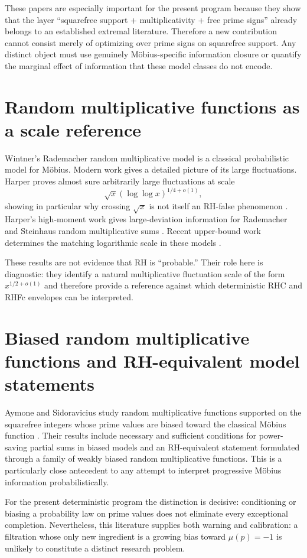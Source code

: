 \documentclass[11pt]{article}
\begin{document}
These papers are especially important for the present program because they show that the layer ``squarefree support + multiplicativity + free prime signs'' already belongs to an established extremal literature.  Therefore a new contribution cannot consist merely of optimizing over prime signs on squarefree support.  Any distinct object must use genuinely Möbius-specific information closure or quantify the marginal effect of information that these model classes do not encode.

\section{Random multiplicative functions as a scale reference}
Wintner's Rademacher random multiplicative model is a classical probabilistic model for Möbius.  Modern work gives a detailed picture of its large fluctuations.  Harper proves almost sure arbitrarily large fluctuations at scale
\[
 \sqrt{x}(\log\log x)^{1/4+o(1)},
\]
showing in particular why crossing $\sqrt{x}$ is not itself an RH-false phenomenon \cite{Harper2023}.  Harper's high-moment work gives large-deviation information for Rademacher and Steinhaus random multiplicative sums \cite{Harper2019}.  Recent upper-bound work determines the matching logarithmic scale in these models \cite{DurkanPearceCrump2026}.

These results are not evidence that RH is ``probable.''  Their role here is diagnostic: they identify a natural multiplicative fluctuation scale of the form $x^{1/2+o(1)}$ and therefore provide a reference against which deterministic RHC and RHFc envelopes can be interpreted.

\section{Biased random multiplicative functions and RH-equivalent model statements}
Aymone and Sidoravicius study random multiplicative functions supported on the squarefree integers whose prime values are biased toward the classical Möbius function \cite{AymoneSidoravicius2017}.  Their results include necessary and sufficient conditions for power-saving partial sums in biased models and an RH-equivalent statement formulated through a family of weakly biased random multiplicative functions.  This is a particularly close antecedent to any attempt to interpret progressive Möbius information probabilistically.

For the present deterministic program the distinction is decisive: conditioning or biasing a probability law on prime values does not eliminate every exceptional completion.  Nevertheless, this literature supplies both warning and calibration: a filtration whose only new ingredient is a growing bias toward $\mu(p)=-1$ is unlikely to constitute a distinct research problem.
\end{document}
